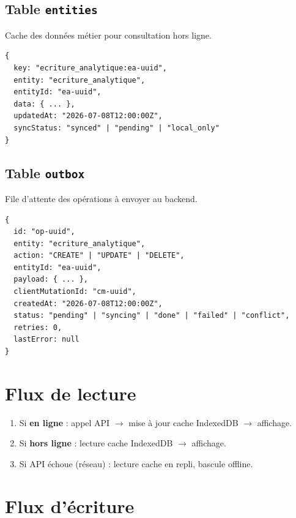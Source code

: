 \documentclass[12pt,a4paper]{report}
\begin{document}
\subsection{Table \texttt{entities}}

Cache des données métier pour consultation hors ligne.

\begin{verbatim}
{
  key: "ecriture_analytique:ea-uuid",
  entity: "ecriture_analytique",
  entityId: "ea-uuid",
  data: { ... },
  updatedAt: "2026-07-08T12:00:00Z",
  syncStatus: "synced" | "pending" | "local_only"
}
\end{verbatim}

\subsection{Table \texttt{outbox}}

File d'attente des opérations à envoyer au backend.

\begin{verbatim}
{
  id: "op-uuid",
  entity: "ecriture_analytique",
  action: "CREATE" | "UPDATE" | "DELETE",
  entityId: "ea-uuid",
  payload: { ... },
  clientMutationId: "cm-uuid",
  createdAt: "2026-07-08T12:00:00Z",
  status: "pending" | "syncing" | "done" | "failed" | "conflict",
  retries: 0,
  lastError: null
}
\end{verbatim}

\section{Flux de lecture}

\begin{enumerate}
  \item Si \textbf{en ligne} : appel API $\rightarrow$ mise à jour cache IndexedDB $\rightarrow$ affichage.
  \item Si \textbf{hors ligne} : lecture cache IndexedDB $\rightarrow$ affichage.
  \item Si API échoue (réseau) : lecture cache en repli, bascule offline.
\end{enumerate}

\section{Flux d'écriture}
\end{document}
